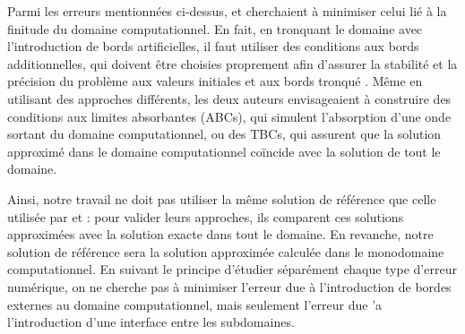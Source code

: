 \indent Parmi les erreurs mentionnées ci-dessus, \cite{zheng2008} et \cite{besse2015} cherchaient à minimiser celui lié à la finitude du domaine computationnel. En fait, en tronquant le domaine avec l'introduction de bords artificielles, il faut utiliser des conditions aux bords additionnelles, qui doivent être choisies proprement afin d'assurer la stabilité et la précision du problème aux valeurs initiales et aux bords tronqué \cite{zheng2008}. Même en utilisant des approches différents, les deux auteurs envisageaient à construire des conditions aux limites absorbantes (ABCs), qui simulent l'absorption d'une onde sortant du domaine computationnel, ou des TBCs, qui assurent que la solution approximé dans le domaine computationnel coïncide avec la solution de tout le domaine.

\indent Ainsi, notre travail ne doit pas utiliser la même solution de référence que celle utilisée par \cite{zheng2008} et \cite{besse2015} : pour valider leurs approches, ils comparent ces solutions approximées avec la solution exacte dans tout le domaine. En revanche, notre solution de référence sera la solution approximée calculée dans le monodomaine computationnel. En suivant le principe d'étudier séparément chaque type d'erreur numérique, on ne cherche pas à minimiser l'erreur due à l'introduction de bordes externes au domaine computationnel, mais seulement l'erreur due 'a l'introduction d'une interface entre les subdomaines.


